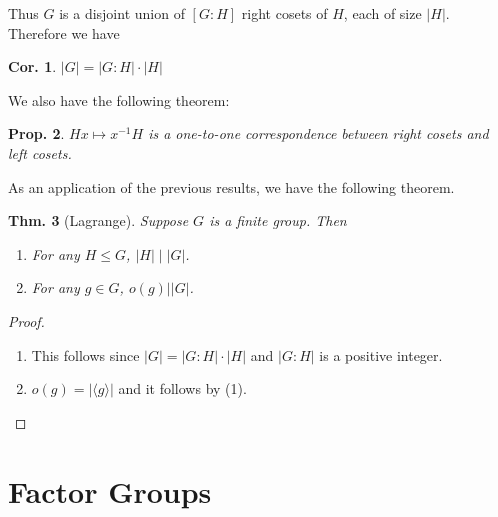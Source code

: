 \documentclass[12pt, a4paper]{book}
\newtheorem{theorem}{Thm.}[section]
\newtheorem{corollary}[theorem]{Cor.}
\newtheorem{proposition}[theorem]{Prop.}
\theoremstyle{nonumberplain}
\newtheorem{proof}{Proof}
\begin{document}
Thus $G$ is a disjoint union of $[G:H]$ right cosets of $H$, each of size $|H|$.
Therefore we have
\begin{corollary}
    $|G|=|G:H|\cdot|H|$
\end{corollary}
We also have the following theorem:
\begin{proposition}
    $Hx\mapsto x^{-1}H$ is a one-to-one correspondence between right cosets and left cosets.
\end{proposition}
As an application of the previous results, we have the following theorem.
\begin{theorem}[Lagrange]
    Suppose $G$ is a finite group.
    Then
    \begin{enumerate}
        \item For any $H\leq G$, $|H|\mid|G|$.
        \item For any $g\in G$, $o(g)||G|$.
    \end{enumerate}
\end{theorem}
\begin{proof}
    \begin{enumerate}
        \item This follows since $|G|=|G:H|\cdot|H|$ and $|G:H|$ is a positive integer.
        \item $o(g)=|\langle g\rangle|$ and it follows by (1).
    \end{enumerate}
\end{proof}
\section{Factor Groups}
\end{document}
